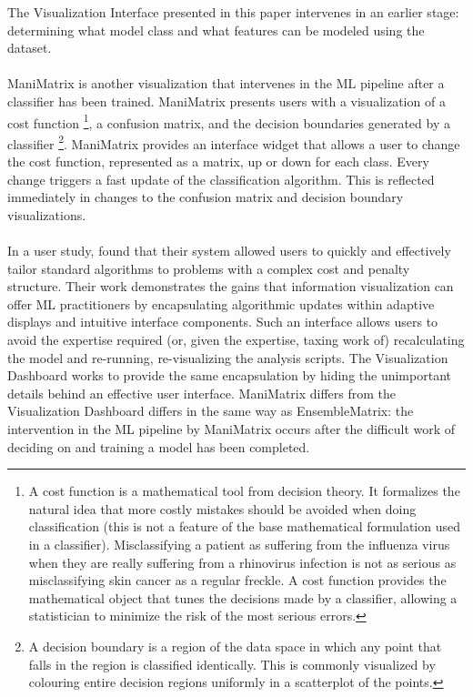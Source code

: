 \documentclass{sigchi}
\begin{document}
%
The Visualization Interface presented in this paper intervenes in an earlier stage: determining what model class and what features can be modeled using the dataset. %
%
\\\\
%
ManiMatrix \cite{kapoor2010interactive} is another visualization that intervenes in the ML pipeline after a classifier has been trained. %
%
ManiMatrix presents users with a visualization of a cost function%
%
\footnote{A cost function is a mathematical tool from decision theory. It formalizes the natural idea that more costly mistakes should be avoided when doing classification (this is not a feature of the base mathematical formulation used in a classifier). %
Misclassifying a patient as suffering from the influenza virus when they are really suffering from a rhinovirus infection is not as serious as misclassifying skin cancer as a regular freckle. %
A cost function provides the mathematical object that tunes the decisions made by a classifier, allowing a statistician to minimize the risk of the most serious errors.}, %
%
a confusion matrix, and the decision boundaries generated by a classifier%
%
\footnote{A decision boundary is a region of the data space in which any point that falls in the region is classified identically. This is commonly visualized by colouring entire decision regions uniformly in a scatterplot of the points.}. %
%
ManiMatrix provides an interface widget that allows a user to change the cost function, represented as a matrix, up or down for each class. %
%
Every change triggers a fast update of the classification algorithm. %
%
This is reflected immediately in changes to the confusion matrix and decision boundary visualizations. %
%
\\\\
%
In a user study, \cite{kapoor2010interactive} found that their system allowed users to quickly and effectively tailor standard algorithms to problems with a complex cost and penalty structure. %
%
Their work demonstrates the gains that information visualization can offer ML practitioners by encapsulating algorithmic updates within adaptive displays and intuitive interface components. %
%
Such an interface allows users to avoid the expertise required (or, given the expertise, taxing work of) recalculating the model and re-running, re-visualizing the analysis scripts. %
%
The Visualization Dashboard works to provide the same encapsulation by hiding the unimportant details behind an effective user interface. %
%
ManiMatrix differs from the Visualization Dashboard differs in the same way as EnsembleMatrix: the intervention in the ML pipeline by ManiMatrix occurs after the difficult work of deciding on and training a model has been completed.%
%
%
\end{document}
